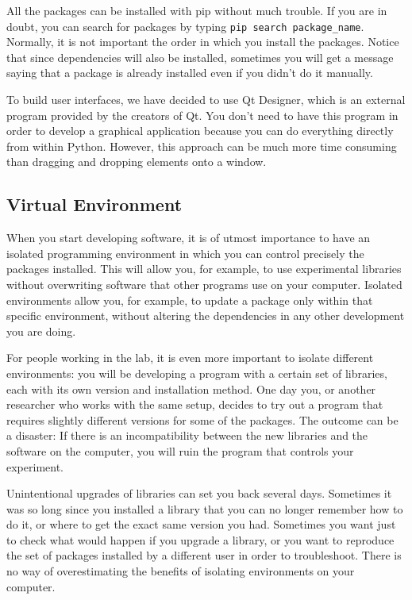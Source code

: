 All the packages can be installed with pip without much trouble. If you are in doubt, you can search for packages by typing \texttt{pip search package_name}. Normally, it is not important the order in which you install the packages. Notice that since dependencies will also be installed, sometimes you will get a message saying that a package is already installed even if you didn't do it manually. 

To build user interfaces, we have decided to use Qt Designer, which is an external program provided by the creators of Qt. You don't need to have this program in order to develop a graphical application because you can do everything directly from within Python. However, this approach can be much more time consuming than dragging and dropping elements onto a window.

\subsection{Virtual Environment}
When you start developing software, it is of utmost importance to have an isolated programming environment in which you can control precisely the packages installed. This will allow you, for example, to use experimental libraries without overwriting software that other programs use on your computer. Isolated environments allow you, for example, to update a package only within that specific environment, without altering the dependencies in any other development you are doing.

For people working in the lab, it is even more important to isolate different environments: you will be developing a program with a certain set of libraries, each with its own version and installation method. One day you, or another researcher who works with the same setup, decides to try out a program that requires slightly different versions for some of the packages. The outcome can be a disaster: If there is an incompatibility between the new libraries and the software on the computer, you will ruin the program that controls your experiment.

Unintentional upgrades of libraries can set you back several days. Sometimes it was so long since you installed a library that you can no longer remember how to do it, or where to get the exact same version you had. Sometimes you want just to check what would happen if you upgrade a library, or you want to reproduce the set of packages installed by a different user in order to troubleshoot. There is no way of overestimating the benefits of isolating environments on your computer. 

